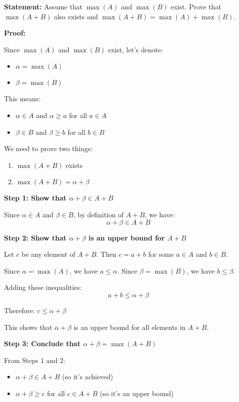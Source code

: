 \documentclass[12pt,a4paper]{article}
\theoremstyle{definition}
\theoremstyle{remark}
\begin{document}
\textbf{Statement:} Assume that $\max(A)$ and $\max(B)$ exist. Prove that $\max(A + B)$ also exists and $\max(A + B) = \max(A) + \max(B)$.

\textbf{Proof:}

Since $\max(A)$ and $\max(B)$ exist, let's denote:
\begin{itemize}
\item $\alpha = \max(A)$
\item $\beta = \max(B)$
\end{itemize}

This means:
\begin{itemize}
\item $\alpha \in A$ and $\alpha \geq a$ for all $a \in A$
\item $\beta \in B$ and $\beta \geq b$ for all $b \in B$
\end{itemize}

We need to prove two things:
\begin{enumerate}
\item $\max(A + B)$ exists
\item $\max(A + B) = \alpha + \beta$
\end{enumerate}

\textbf{Step 1: Show that $\alpha + \beta \in A + B$}

Since $\alpha \in A$ and $\beta \in B$, by definition of $A + B$, we have:
$$\alpha + \beta \in A + B$$

\textbf{Step 2: Show that $\alpha + \beta$ is an upper bound for $A + B$}

Let $c$ be any element of $A + B$. Then $c = a + b$ for some $a \in A$ and $b \in B$.

Since $\alpha = \max(A)$, we have $a \leq \alpha$.
Since $\beta = \max(B)$, we have $b \leq \beta$.

Adding these inequalities:
$$a + b \leq \alpha + \beta$$

Therefore: $c \leq \alpha + \beta$

This shows that $\alpha + \beta$ is an upper bound for all elements in $A + B$.

\textbf{Step 3: Conclude that $\alpha + \beta = \max(A + B)$}

From Steps 1 and 2:
\begin{itemize}
\item $\alpha + \beta \in A + B$ (so it's achieved)
\item $\alpha + \beta \geq c$ for all $c \in A + B$ (so it's an upper bound)
\end{itemize}
\end{document}
